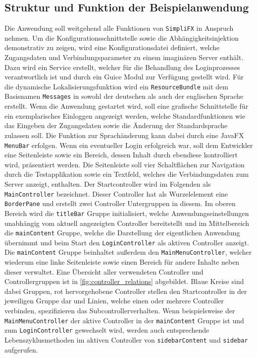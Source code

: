 \subsection{Struktur und Funktion der Beispielanwendung}
Die Anwendung soll weitgehend alle Funktionen von \texttt{SimpliFX} in Anspruch nehmen. Um die Konfigurationsschnittstelle sowie die Abhängigkeitsinjektion demonstrativ zu zeigen, wird eine Konfigurationsdatei definiert, welche Zugangsdaten und Verbindungsparameter zu einem imaginären Server enthält. Dazu wird ein Service erstellt, welcher für die Behandlung des Loginprozesses verantwortlich ist und durch ein Guice Modul zur Verfügung gestellt wird. Für die dynamische Lokalisierungsfunktion wird ein \texttt{ResourceBundle} mit dem Basisnamen \texttt{Messages} in sowohl der deutschen als auch der englischen Sprache erstellt. Wenn die Anwendung gestartet wird, soll eine grafische Schnittstelle für ein exemplarisches Einloggen angezeigt werden, welche Standardfunktionen wie das Eingeben der Zugangsdaten sowie die Änderung der Standardsprache zulassen soll. Die Funktion zur Sprachänderung kann dabei durch eine JavaFX \texttt{MenuBar} erfolgen. Wenn ein eventueller Login erfolgreich war, soll dem Entwickler eine Seitenleiste sowie ein Bereich, dessen Inhalt durch ebendiese kontrolliert wird, präsentiert werden. Die Seitenleiste soll vier Schaltflächen zur Navigation durch die Testapplikation sowie ein Textfeld, welches die Verbindungsdaten zum Server anzeigt, enthalten. Der Startcontroller wird im Folgenden als \texttt{MainController} bezeichnet. 
Dieser Controller hat als Wurzelelement eine \texttt{BorderPane} und erstellt zwei Controller Untergruppen in diesem. Im oberen Bereich wird die \texttt{titleBar} Gruppe initialisiert, welche Anwendungseinstellungen unabhängig vom aktuell angezeigten Controller bereitstellt und im Mittelbereich die \texttt{mainContent} Gruppe, welche die Darstellung der eigentlichen Anwendung übernimmt und beim Start den \texttt{LoginController} als aktiven Controller anzeigt. Die \texttt{mainContent} Gruppe beinhaltet außerdem den \texttt{MainMenuController}, welcher wiederum eine linke Seitenleiste sowie einen Bereich für andere Inhalte neben dieser verwaltet. Eine Übersicht aller verwendeten Controller und Controllergruppen ist in \autoref{fig:controller_relations} abgebildet. Blaue Kreise sind dabei Gruppen, rot hervorgehobene Controller stellen den Startcontroller in der jeweiligen Gruppe dar und Linien, welche einen oder mehrere Controller verbinden, spezifizieren das Subcontrollerverhalten. Wenn beispielsweise der \texttt{MainMenuController} der aktive Controller in der \texttt{mainContent} Gruppe ist und zum \texttt{LoginController} gewechselt wird, werden auch entsprechende Lebenszyklusmethoden im aktiven Controller von \texttt{sidebarContent} und \texttt{sidebar} aufgerufen.
